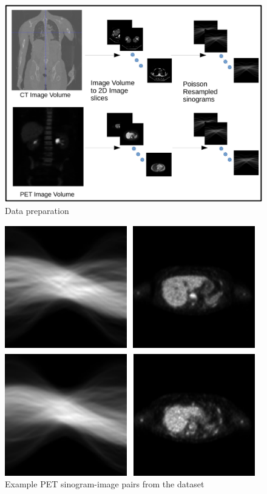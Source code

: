 \begin{figure}[!htbp]
	\centering
	\includegraphics[width=0.99\linewidth]{./Figures/dataset_gen-crop.pdf}
	\caption{Data preparation}
	\label{fig:data_prep}
\end{figure}

\begin{figure}[!htbp]
	\centering
	\includegraphics[width=0.5\linewidth]{./Figures/PET_sample-crop.pdf}
	\caption{Example PET sinogram-image pairs from the dataset}
	\label{fig:realdata}
\end{figure}


